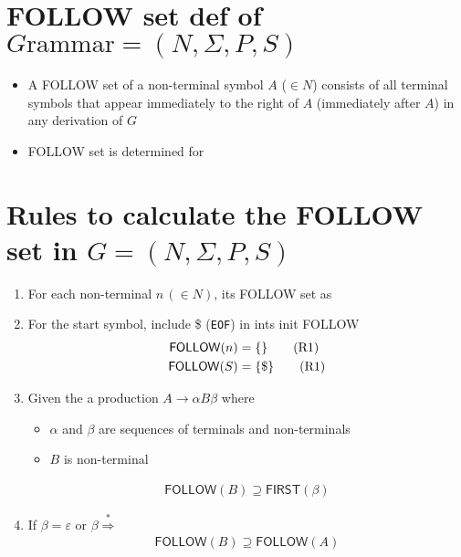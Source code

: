 \documentclass[10pt,a4paper,landscape]{article}
\begin{document}
\begin{multicols*}{3}
\section*{FOLLOW set def of $G\text{rammar}=(N,\Sigma, P, S)$}
\begin{itemize}
\item A \textsf{FOLLOW} set of a non-terminal symbol $A$ ($\in N$) consists of all terminal symbols that appear immediately to the right of $A$ (immediately after $A$) in any derivation of $G$
\item \textsf{FOLLOW} set is determined for 
\end{itemize}
\section*{Rules to calculate the FOLLOW set in $G=(N,\Sigma, P, S)$}
\begin{enumerate}
\item For each non-terminal $n\,(\in N)$,  its \textsf{FOLLOW} set as \mset{}
\item[] For the start symbol, include \$ (\texttt{EOF}) in ints init \textsf{FOLLOW}
  \begin{align*}
    \mathsf{FOLLOW}(n) &= \{\}  \tag{R1} \\
    \mathsf{FOLLOW}(S) &= \{\$\} \tag{R1}
  \end{align*}
\item Given the a production $A\to \alpha B \beta$ where
  \begin{itemize}
  \item $\alpha$ and $\beta$ are sequences of terminals and non-terminals
  \item $B$ is non-terminal
  \end{itemize}
  \begin{align*}
    \mathsf{FOLLOW}(B) \supseteq \mathsf{FIRST}(\beta) \tag{R2}
  \end{align*}
\item If $\beta = \varepsilon$ or $\beta \overset{\ast}{\Rightarrow} $
  \begin{align*}
    \mathsf{FOLLOW}(B) \supseteq \mathsf{FOLLOW}(A) \tag{R3}
  \end{align*}
\
\end{enumerate}

\end{multicols*}
\end{document}

